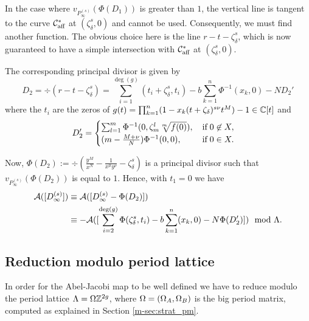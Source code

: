 \documentclass[main.tex]{subfiles}
\begin{document}
    \bigskip
    
    In the case where $v_{P_{\infty}^{(s)}}(\Phi(D_1))$ is greater than $1$, the vertical line is tangent to the curve $\mathcal{C}_{\text{aff}}^{*}$ 
    at $(\zeta_{\delta}^s,0)$ and cannot be used.
    Consequently, we must find another function. The obvious choice here is the line $r - t -  \zeta_{\delta}^s$, which
    is now guaranteed to have a simple intersection with $\mathcal{C}_{\text{aff}}^{*}$ 
    at $(\zeta_{\delta}^s,0)$.

    The corresponding principal divisor is given by
     \begin{equation}
      D_2 = \div(r - t - \zeta_{\delta}^s) = \sum_{i = 1}^{\deg(g)} (t_i+\zeta_{\delta}^s,t_i) - b \sum_{k=1}^n
      \Phi^{-1}(x_k,0)- N D_2'
   \end{equation}
      where the $t_i$ are the zeros of $g(t) = \prod_{k=1}^n (1-x_k(t+\zeta_{\delta})^{s\nu}t^M) - 1 \in \mathbb{C}[t]$ and
    \begin{equation}
       D_2' = \begin{cases}
             \sum_{l=1}^m \Phi^{-1}(0,\zeta_m^l \sqrt[m]{f(0)}), \quad \text{if} \; 0 \not\in X,\\
             (m-\frac{M+\nu}{N}) \Phi^{-1}(0,0), \hfill \text{if} \; 0 \in X.
            \end{cases}
    \end{equation}
 
    Now, $\Phi(D_2) := \div \left( \frac{y^M}{x^N} - \frac{1}{x^{\mu}y^{\nu}} - \zeta_{\delta}^s \right)$
    is a principal divisor such that
    $v_{P_{\infty}^{(s)}}(\Phi(D_2))$ is equal to $1$. Hence, with $t_1 = 0$ we have
     \begin{align}
      \mathcal{A}( [D_{\infty}^{(s)}] )  & \equiv  \mathcal{A}([D_{\infty}^{(s)} - \Phi(D_2)])  \\
      & \equiv  -\mathcal{A}( [\sum_{i = 2}^{\operatorname{deg}(g)} \Phi(\zeta_{\delta}^s,t_i) - b \sum_{k=1}^n
      (x_k,0) - N \Phi(D_2') ] )
       \mod \Lambda.
    \end{align}
    
  \subsection{Reduction modulo period lattice}\label{subsec:lat_red}

    In order for the Abel-Jacobi map to be well defined we have to reduce modulo the period lattice $\Lambda = 
  \Omega\mathbb{Z}^{2g}$, where $\Omega = (\Omega_A, \Omega_B)$ is the big period matrix, computed as explained in
  Section \ref{m-sec:strat_pm}.
   
\end{document}
